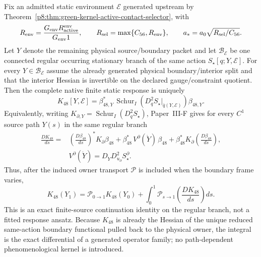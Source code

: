 \documentclass[12pt,a4paper]{article}
\begin{document}
\begin{theorem}
\label{p8:thm:v2123-fixed-environment-static-response}
Fix an admitted static environment $\mathcal E$ generated upstream by
Theorem~\ref{p8:thm:green-kernel-active-contact-selector}, with
\[
 R_{\rm env}=\frac{G_{\rm env} R_{\rm active}^{\rm env}}{G_{\rm env}1},
 \qquad
 R_{\rm sel}=\max\{C_{56},R_{\rm env}\},
 \qquad
 a_*=a_0\sqrt{R_{\rm sel}/C_{56}}.
\]
Let $Y$ denote the remaining physical source/boundary packet and let
$\mathscr B_{\mathcal E}$ be one connected regular occurring stationary branch
of the same action $S_\star[q;Y,\mathcal E]$.  For every
$Y\in\mathscr B_{\mathcal E}$ assume the already generated physical
boundary/interior split and that the interior Hessian is invertible on the
declared gauge/constraint quotient.  Then the complete native finite static
response is uniquely
\begin{equation}
\label{p8:eq:v2123-fixed-environment-k48}
 \boxed{
 K_{48}[Y,\mathcal E]
 =\beta_{48,Y}^{*}\,
 \operatorname{Schur}_{I}\!\left(
 D_q^2S_\star\big|_{\bar q(Y,\mathcal E)}
 \right)\beta_{48,Y}.}
\end{equation}
Equivalently, writing
$K_{\partial,Y}=\operatorname{Schur}_{I}(D_q^2S_\star)$, Paper~III-F gives
for every $C^1$ source path $Y(s)$ in the same regular branch
\begin{align}
\label{p8:eq:v2123-k48-source-derivative}
 \frac{D K_{48}}{ds}
 ={}&
 \left(\frac{D\beta_{48}}{ds}\right)^*K_\partial\beta_{48}
 +\beta_{48}^*\,
 V^\partial(\dot Y)\,\beta_{48}
 +\beta_{48}^*K_\partial
 \left(\frac{D\beta_{48}}{ds}\right),\\
 &V^\partial(\dot Y)
 =D_{\dot Y}D_{u_\partial}^2S_\star^\partial .\nonumber
\end{align}
Thus, after the induced owner transport $\mathcal P$ is included when the
boundary frame varies,
\begin{equation}
\label{p8:eq:v2123-k48-finite-continuation}
 \boxed{
 K_{48}(Y_1)
 =\mathcal P_{0\to1}K_{48}(Y_0)
 +\int_0^1\mathcal P_{s\to1}
 \!\left(\frac{D K_{48}}{ds}\right)ds .}
\end{equation}
This is an exact finite-source continuation identity on the regular branch,
not a fitted response ansatz.  Because $K_{48}$ is already the Hessian of the
unique reduced same-action boundary functional pulled back to the physical
owner, the integral is the exact differential of a generated operator family;
no path-dependent phenomenological kernel is introduced.


\end{theorem}
\end{document}
